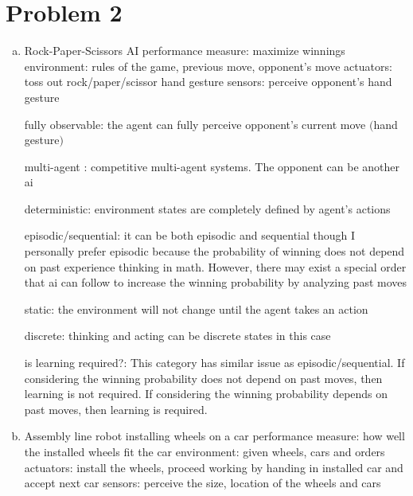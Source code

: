 \documentclass[11pt]{article}
\begin{document}
\section*{Problem 2}

\begin{enumerate}[(a)]
    \item Rock-Paper-Scissors AI \newline
    performance measure: maximize winnings \newline
    environment: rules of the game, previous move, opponent's move \newline
    actuators: toss out rock/paper/scissor hand gesture \newline
    sensors: perceive opponent's hand gesture \newline
    
    fully observable: the agent can fully perceive opponent's current move $($hand gesture$)$ \newline
    
    multi-agent : competitive multi-agent systems. The opponent can be another ai \newline
    
    deterministic: environment states are completely defined by agent's actions \newline
    
    episodic/sequential: it can be both episodic and sequential though I personally prefer episodic because the probability of winning does not depend on past experience thinking in math. However, there may exist a special order that ai can follow to increase the winning probability by analyzing past moves \newline
    
    static: the environment will not change until the agent takes an action \newline
    
    discrete: thinking and acting can be discrete states in this case \newline
    
    is learning required?: This category has similar issue as episodic/sequential. If considering the winning probability does not depend on past moves, then learning is not required. If considering the winning probability depends on past moves, then learning is required. \newline
    
    
    
    \item Assembly line robot installing wheels on a car \newline
    performance measure: how well the installed wheels fit the car \newline
    environment: given wheels, cars and orders \newline
    actuators: install the wheels, proceed working by handing in installed car and accept next car  \newline
    sensors: perceive the size, location of the wheels and cars \newline
    

\end{enumerate}
\end{document}

